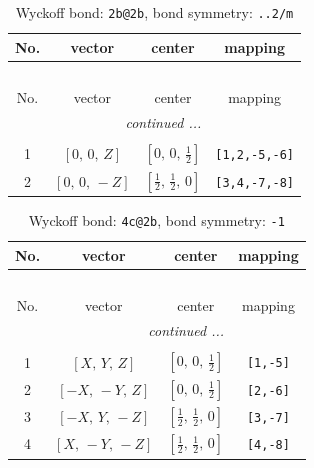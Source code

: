 \documentclass[fleqn,8pt]{jsarticle}
\begin{document}
\renewcommand{\arraystretch}{1.2}
\begin{longtable}{cccc}
\caption{Wyckoff bond: {\tt 2b@2b}, bond symmetry: {\tt ..2/m}}
 \\
 \hline \hline
No. & vector & center & mapping \\ \hline \endfirsthead

\multicolumn{3}{l}{\tablename\ \thetable{}} \\
 \hline \hline
No. & vector & center & mapping \\ \hline \endhead

 \hline \hline
\multicolumn{3}{r}{\footnotesize\it continued ...} \\ \endfoot

 \hline \hline
\multicolumn{3}{r}{} \\ \endlastfoot

1 & $\left[ 0,\, 0,\, Z \right]$ & $\left[ 0,\, 0,\, \frac{1}{2} \right]$ & {\tt [1,2,-5,-6]} \\ \hline
2 & $\left[ 0,\, 0,\, - Z \right]$ & $\left[ \frac{1}{2},\, \frac{1}{2},\, 0 \right]$ & {\tt [3,4,-7,-8]} \\
\end{longtable}
\renewcommand{\arraystretch}{1.2}
\begin{longtable}{cccc}
\caption{Wyckoff bond: {\tt 4c@2b}, bond symmetry: {\tt -1}}
 \\
 \hline \hline
No. & vector & center & mapping \\ \hline \endfirsthead

\multicolumn{3}{l}{\tablename\ \thetable{}} \\
 \hline \hline
No. & vector & center & mapping \\ \hline \endhead

 \hline \hline
\multicolumn{3}{r}{\footnotesize\it continued ...} \\ \endfoot

 \hline \hline
\multicolumn{3}{r}{} \\ \endlastfoot

1 & $\left[ X,\, Y,\, Z \right]$ & $\left[ 0,\, 0,\, \frac{1}{2} \right]$ & {\tt [1,-5]} \\ \hline
2 & $\left[ - X,\, - Y,\, Z \right]$ & $\left[ 0,\, 0,\, \frac{1}{2} \right]$ & {\tt [2,-6]} \\ \hline
3 & $\left[ - X,\, Y,\, - Z \right]$ & $\left[ \frac{1}{2},\, \frac{1}{2},\, 0 \right]$ & {\tt [3,-7]} \\ \hline
4 & $\left[ X,\, - Y,\, - Z \right]$ & $\left[ \frac{1}{2},\, \frac{1}{2},\, 0 \right]$ & {\tt [4,-8]} \\
\end{longtable}
\end{document}
